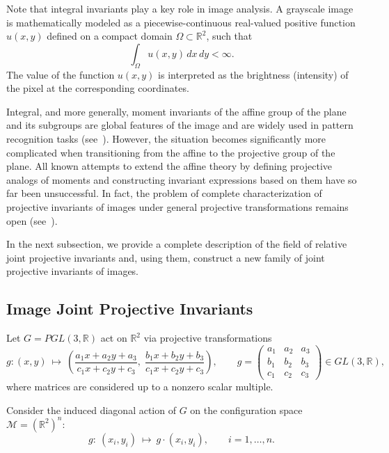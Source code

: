 \documentclass[12pt,reqno]{amsart}
\begin{document}
\medskip

Note that integral invariants play a key role in image analysis. A grayscale image is mathematically modeled as a piecewise-continuous real-valued positive function \(u(x,y)\) defined on a compact domain \(\Omega \subset \mathbb{R}^2\), such that
$$
 \int_{\Omega} u(x,y)\,dx\,dy < \infty.
$$
The value of the function \(u(x,y)\) is interpreted as the brightness (intensity) of the pixel at the corresponding coordinates.

Integral, and more generally, moment invariants of the affine group of the plane and its subgroups are global features of the image and are widely used in pattern recognition tasks (see~\cite{FSB}). 
However, the situation becomes significantly more complicated when transitioning from the affine to the projective group of the plane. All known attempts to extend the affine theory by defining projective analogs of moments and constructing invariant expressions based on them have so far been unsuccessful. In fact, the problem of complete characterization of projective invariants of images under general projective transformations remains open (see~\cite{Open}).

In the next subsection, we provide a complete description of the field of relative joint projective invariants and, using them, construct a new family of joint projective invariants of images.

\subsection{Image Joint Projective Invariants}

Let \(G = PGL(3,\mathbb{R})\) act on \(\mathbb{R}^2\) via projective transformations
\begin{equation}\label{pgl-action-point}
g:(x,y)\ \longmapsto\
\left(
  \frac{a_1x+a_2y+a_3}{c_1x+c_2y+c_3},\;
  \frac{b_1x+b_2y+b_3}{c_1x+c_2y+c_3}
\right),
\qquad
g=\begin{pmatrix}
a_1&a_2&a_3\\
b_1&b_2&b_3\\
c_1&c_2&c_3
\end{pmatrix}\in GL(3,\mathbb{R}),
\end{equation}
where matrices are considered up to a nonzero scalar multiple.

Consider the induced diagonal action of \(G\) on the configuration space
\(\mathcal M = (\mathbb{R}^2)^n\):
$$
g:\ (x_i,y_i)\ \longmapsto\ g\cdot(x_i,y_i),\qquad i=1,\dots,n.
$$
\end{document}

